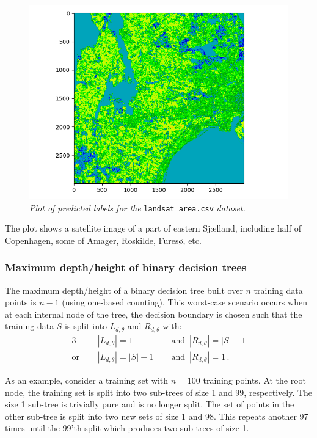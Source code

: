 \begin{figure}[H]
  \includegraphics[width=\textwidth]{figures/landsat_area_predictions.png}
  \vspace{-0.8cm}
  \caption{\small \textit{Plot of predicted labels for the}
  \texttt{landsat\_area.csv} \textit{dataset.}}
  \label{fig:landsat_area}
\end{figure}

The plot shows a satellite image of a part of eastern Sjælland, including half
of Copenhagen, some of Amager, Roskilde, Furesø, etc.

\subsubsection{Maximum depth/height of binary decision trees}

The maximum depth/height of a binary decision tree built over $n$ training data points
is $n - 1$ (using one-based counting). This worst-case scenario occurs when at
each internal node of the tree, the decision boundary is chosen such that the
training data $S$ is split into $L_{d, \theta}$ and $R_{d, \theta}$ with:
\begin{alignat}{3}
  &|L_{d, \theta}| = 1 &&\, \text{ and }\,  |R_{d, \theta}| = |S| - 1\\[6pt]
  \text{or }\quad &|L_{d, \theta}| = |S| - 1 &&\, \text{ and }\,  |R_{d, \theta}| =
  1\, .\label{eq:norm}
\end{alignat}

As an example, consider a training set with $n = 100$ training points. At the
root node, the training set is split into two sub-trees of size 1 and 99,
respectively. The size 1 sub-tree is trivially pure and is no longer split. The
set of points in the other sub-tree is split into two new sets of size 1 and 98.
This repeats another 97 times until the 99'th split which produces two sub-trees
of size 1.

